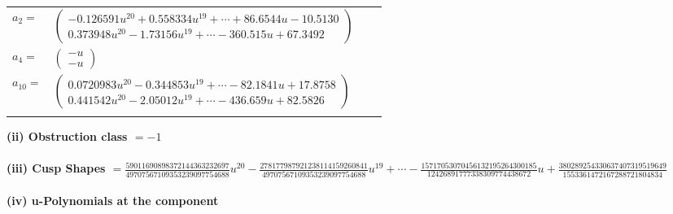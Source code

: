 \documentclass[1p]{elsarticle_modified}
\theoremstyle{definition}
\begin{document}
\begin{tabular}{m{7pt} m{180pt} m{7pt} m{180pt} }
\flushright $a_{2}=$&$\begin{pmatrix}-0.126591 u^{20}+0.558334 u^{19}+\cdots+86.6544 u-10.5130\\0.373948 u^{20}-1.73156 u^{19}+\cdots-360.515 u+67.3492\end{pmatrix}$ \\
\flushright $a_{4}=$&$\begin{pmatrix}- u\\- u\end{pmatrix}$ \\
\flushright $a_{10}=$&$\begin{pmatrix}0.0720983 u^{20}-0.344853 u^{19}+\cdots-82.1841 u+17.8758\\0.441542 u^{20}-2.05012 u^{19}+\cdots-436.659 u+82.5826\end{pmatrix}$\\&\end{tabular}
\flushleft \textbf{(ii) Obstruction class $= -1$}\\~\\
\flushleft \textbf{(iii) Cusp Shapes $= \frac{59011690898372144363232697}{49707567109353239097754688} u^{20}-\frac{278177987921238114159260841}{49707567109353239097754688} u^{19}+\cdots-\frac{15717053070456132195264300185}{12426891777338309774438672} u+\frac{380289254330637407319519649}{1553361472167288721804834}$}\\~\\
\newpage\renewcommand{\arraystretch}{1}
\flushleft \textbf{(iv) u-Polynomials at the component}\newline \\
\end{document}
